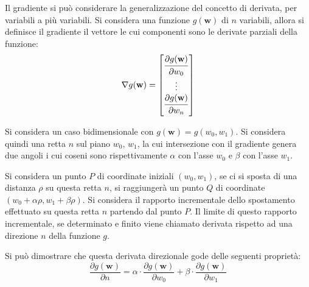 \documentclass{article}
\numberwithin{equation}{subsection}
\newcommand{\vect}[1]{\boldsymbol{\mathbf{#1}}}
\begin{document}
Il gradiente si può considerare la generalizzazione del concetto di derivata, per 
variabili a più variabili. Si considera una funzione $g(\vect{w})$ di $n$ variabili, 
allora si definisce il gradiente il vettore le cui componenti sono le derivate parziali 
della funzione:
\begin{equation}
    \nabla g(\vect{w})=\begin{bmatrix}
        \displaystyle\frac{\strut\partial g(\vect{w})}{\strut\partial w_0}\\\vdots\\
        \displaystyle\frac{\strut\partial g(\vect{w})}{\strut\partial w_n}
    \end{bmatrix}
\end{equation}


Si considera un caso bidimensionale con $g(\vect{w})=g(w_0,w_1)$. Si considera quindi 
una retta $n$ sul piano $w_0,\,w_1$, la cui intersezione con il gradiente genera due 
angoli i cui coseni sono rispettivamente $\alpha$ con l'asse $w_0$ e $\beta$ con l'asse $w_1$. 

Si considera un punto $P$ di coordinate iniziali $(w_0,w_1)$, se ci si sposta di una 
distanza $\rho$ su questa retta $n$, si raggiungerà un punto $Q$ di coordinate $(w_0+\alpha\rho,w_1+\beta\rho)$. 
Si considera il rapporto incrementale dello spostamento effettuato su questa retta $n$ 
partendo dal punto $P$. Il limite di questo rapporto incrementale, se determinato e 
finito viene chiamato derivata rispetto ad una direzione $n$ della funzione $g$. 


Si può dimostrare che questa derivata direzionale gode delle seguenti proprietà:
\begin{equation}
    \displaystyle\frac{\partial g(\vect{w})}{\partial n}=\alpha\cdot\frac{\partial g(\vect{w})}{\partial w_0}+\beta\cdot\frac{\partial g(\vect{w})}{\partial w_1}
\end{equation}
\end{document}

